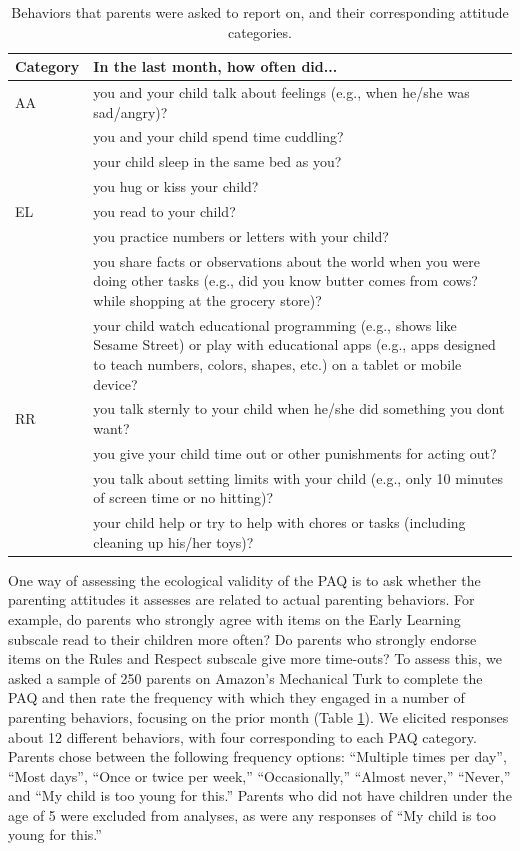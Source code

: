 \documentclass[man]{apa6}
\theoremstyle{definition}
\theoremstyle{definition}
\theoremstyle{definition}
\theoremstyle{remark}
\begin{document}
\begin{table}

\caption{\label{tab:behavesents}Behaviors that parents were asked to report on, and their corresponding attitude categories.}
\centering
\begin{tabular}[t]{l|>{\raggedright\arraybackslash}p{35em}}
\hline
Category & In the last month, how often did...\\
\hline
AA & you and your child talk about feelings (e.g., when he/she was sad/angry)?\\
\hline
 & you and your child spend time cuddling?\\
\hline
 & your child sleep in the same bed as you?\\
\hline
 & you hug or kiss your child?\\
\hline
EL & you read to your child?\\
\hline
 & you practice numbers or letters with your child?\\
\hline
 & you share facts or observations about the world when you were doing other tasks (e.g., did you know butter comes from cows? while shopping at the grocery store)?\\
\hline
 & your child watch educational programming (e.g., shows like Sesame Street) or play with educational apps (e.g., apps designed to teach numbers, colors, shapes, etc.) on a tablet or mobile device?\\
\hline
RR & you talk sternly to your child when he/she did something you dont want?\\
\hline
 & you give your child time out or other punishments for acting out?\\
\hline
 & you talk about setting limits with your child (e.g., only 10 minutes of screen time or no hitting)?\\
\hline
 & your child help or try to help with chores or tasks (including cleaning up his/her toys)?\\
\hline
\end{tabular}
\end{table}

One way of assessing the ecological validity of the PAQ is to ask
whether the parenting attitudes it assesses are related to actual
parenting behaviors. For example, do parents who strongly agree with
items on the Early Learning subscale read to their children more often?
Do parents who strongly endorse items on the Rules and Respect subscale
give more time-outs? To assess this, we asked a sample of 250 parents on
Amazon's Mechanical Turk to complete the PAQ and then rate the frequency
with which they engaged in a number of parenting behaviors, focusing on
the prior month (Table \ref{tab:behavesents}). We elicited responses
about 12 different behaviors, with four corresponding to each PAQ
category. Parents chose between the following frequency options:
\enquote{Multiple times per day}, \enquote{Most days}, \enquote{Once or
twice per week,} \enquote{Occasionally,} \enquote{Almost never,}
\enquote{Never,} and \enquote{My child is too young for this.} Parents
who did not have children under the age of 5 were excluded from
analyses, as were any responses of \enquote{My child is too young for
this.}
\end{document}
